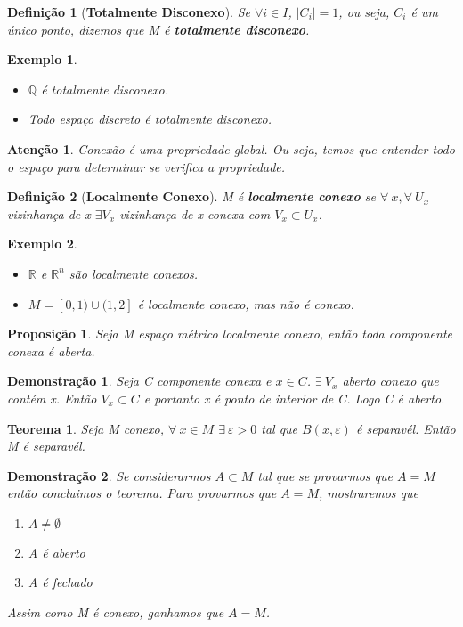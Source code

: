 \documentclass{article}
\newtheorem*{definition}{Definição}
\newtheorem*{theorem}{Teorema}
\newtheorem*{exemplo}{Exemplo}
\newtheorem*{atencao}{Atenção}
\newtheorem*{proposicao}{Proposição}
\newtheorem*{prova}{Demonstração}
\newcommand{\R}{\mathbb{R}}
\newcommand{\eps}{\varepsilon}
\begin{document}
\begin{definition}[\textbf{Totalmente Disconexo}]
    Se $\forall i \in I$, $|C_i| = 1$, ou seja, $C_i$ é um único ponto, dizemos que 
    M é \textbf{totalmente disconexo}.
\end{definition}

\begin{exemplo}
    \
    \begin{itemize}
        \item $\mathbb{Q}$ é totalmente disconexo.
        \item Todo espaço discreto é totalmente disconexo.
    \end{itemize}
\end{exemplo}

\begin{atencao}
    Conexão é uma propriedade global.
     Ou seja, temos que entender todo o espaço para determinar se verifica a propriedade.
\end{atencao}

\begin{definition}[\textbf{Localmente Conexo}]
    M é \textbf{localmente conexo} se $\forall \: x, \forall \: U_x$ vizinhança de x $\exists V_x$
    vizinhança de x conexa com $V_x \subset U_x$.
\end{definition}

\begin{exemplo}
    \
    \begin{itemize}
        \item $\R$ e $\R^n$ são localmente conexos.
        \item $M = [0, 1) \cup (1, 2]$ é localmente conexo, mas não é conexo.
    \end{itemize}
\end{exemplo}

\begin{proposicao}
    Seja M espaço métrico localmente conexo, então toda componente conexa é aberta.
\end{proposicao}

\begin{prova}
    Seja C componente conexa e $x \in C$.
    $\exists \: V_x$ aberto conexo que contém x. 
    Então $V_x \subset C$ e portanto x é ponto de interior de C.
    Logo C é aberto. 
\end{prova}

\begin{theorem}
    Seja M conexo, $\forall \: x \in M$ $\exists \: \eps > 0$ tal que $B(x, \eps)$ é separavél.
    Então M é separavél.
\end{theorem}

\begin{prova}
    Se considerarmos $A \subset M$ tal que se provarmos que $A = M$ então concluimos o teorema.
    Para provarmos que $A = M$, mostraremos que 
    \begin{enumerate}
        \item $A \neq \emptyset$
        \item A é aberto
        \item A é fechado
    \end{enumerate}
    Assim como M é conexo, ganhamos que $A = M$.
\end{prova}
\end{document}
